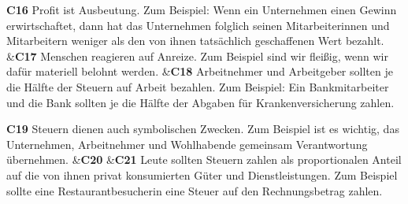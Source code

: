 \documentclass[
		11pt,
		a4paper,
		openright,
		oneside,
		ngerman
	]
	{book}
\begin{document}
\begin{longtabu}[htpb]
\textbf{C16} %
		Profit ist Ausbeutung.
		Zum Beispiel: Wenn ein Unternehmen einen Gewinn erwirtschaftet, dann hat das Unternehmen folglich seinen Mitarbeiterinnen und Mitarbeitern weniger als den von ihnen tatsächlich geschaffenen Wert bezahlt.
&\textbf{C17} %
		Menschen reagieren auf Anreize.
		Zum Beispiel sind wir fleißig, wenn wir dafür materiell belohnt werden.
&\textbf{C18} %
		Arbeitnehmer und Arbeitgeber sollten je die Hälfte der Steuern auf Arbeit bezahlen.
		Zum Beispiel: Ein Bankmitarbeiter und die Bank sollten je die Hälfte der Abgaben für Krankenversicherung zahlen.
\\

\midrule

\textbf{C19} %
		Steuern dienen auch symbolischen Zwecken.
		Zum Beispiel ist es wichtig, das Unternehmen, Arbeitnehmer und Wohlhabende gemeinsam Verantwortung übernehmen.
&\textbf{C20}
&\textbf{C21} %
		Leute sollten Steuern zahlen als proportionalen Anteil auf die von ihnen privat konsumierten Güter und Dienstleistungen.
		Zum Beispiel sollte eine Restaurantbesucherin eine Steuer auf den Rechnungsbetrag zahlen.
\\

\midrule


\end{longtabu}
\end{document}
